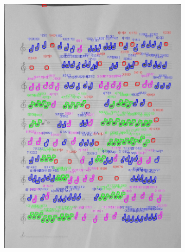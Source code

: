 \documentclass[11pt]{article}
\begin{document}
\begin{figure}[H]
    \centering
    \begin{subfigure}{.45\textwidth}
        \centering
        \graphicspath{ {blobs/} }
        \includegraphics[width=\linewidth]{21_cnts.jpg}
        \label{fig:sub1}
    \end{subfigure}%
    \begin{subfigure}{.45\textwidth}
        \centering
        \graphicspath{ {blobs/} }

\end{subfigure}
\end{figure}
\end{document}
